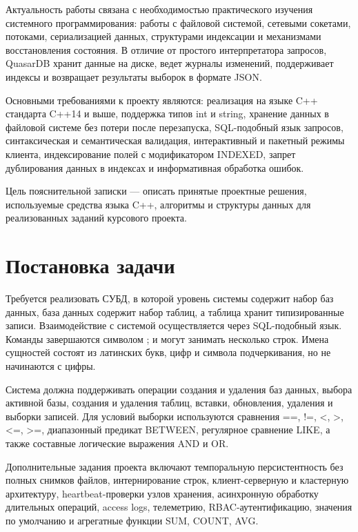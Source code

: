 \documentclass[a4paper,14pt]{extarticle}
\renewcommand{\texttt}[1]{\textrm{#1}}
\begin{document}
Актуальность работы связана с необходимостью практического изучения системного программирования: работы с файловой системой, сетевыми сокетами, потоками, сериализацией данных, структурами индексации и механизмами восстановления состояния. В отличие от простого интерпретатора запросов, QuasarDB хранит данные на диске, ведет журналы изменений, поддерживает индексы и возвращает результаты выборок в формате JSON.

Основными требованиями к проекту являются: реализация на языке C++ стандарта C++14 и выше, поддержка типов \texttt{int} и \texttt{string}, хранение данных в файловой системе без потери после перезапуска, SQL-подобный язык запросов, синтаксическая и семантическая валидация, интерактивный и пакетный режимы клиента, индексирование полей с модификатором \texttt{INDEXED}, запрет дублирования данных в индексах и информативная обработка ошибок.

Цель пояснительной записки — описать принятые проектные решения, используемые средства языка C++, алгоритмы и структуры данных для реализованных заданий курсового проекта.

\section{Постановка задачи}

Требуется реализовать СУБД, в которой уровень системы содержит набор баз данных, база данных содержит набор таблиц, а таблица хранит типизированные записи. Взаимодействие с системой осуществляется через SQL-подобный язык. Команды завершаются символом \texttt{;} и могут занимать несколько строк. Имена сущностей состоят из латинских букв, цифр и символа подчеркивания, но не начинаются с цифры.

Система должна поддерживать операции создания и удаления баз данных, выбора активной базы, создания и удаления таблиц, вставки, обновления, удаления и выборки записей. Для условий выборки используются сравнения \texttt{==}, \texttt{!=}, \texttt{<}, \texttt{>}, \texttt{<=}, \texttt{>=}, диапазонный предикат \texttt{BETWEEN}, регулярное сравнение \texttt{LIKE}, а также составные логические выражения \texttt{AND} и \texttt{OR}.

Дополнительные задания проекта включают темпоральную персистентность без полных снимков файлов, интернирование строк, клиент-серверную и кластерную архитектуру, heartbeat-проверки узлов хранения, асинхронную обработку длительных операций, access logs, телеметрию, RBAC-аутентификацию, значения по умолчанию и агрегатные функции \texttt{SUM}, \texttt{COUNT}, \texttt{AVG}.
\end{document}
